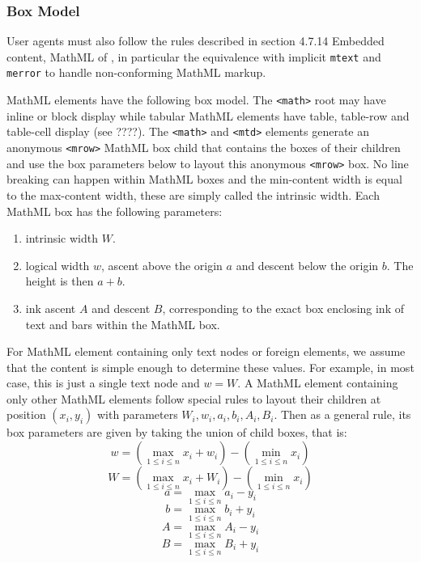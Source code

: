 \subsubsection{Box Model}

User agents must also follow the rules described in section 4.7.14
Embedded content, MathML of \cite{HTML5}, in particular the equivalence with
implicit {\tt mtext} and {\tt merror} to handle non-conforming MathML markup.

MathML elements have the following box model. The {\tt <math>} root may have
inline or block display while tabular MathML elements have table, table-row and
table-cell display (see ????). The {\tt <math>} and {\tt <mtd>} elements
generate an anonymous {\tt <mrow>} MathML box child that contains the boxes of
their children and use the box parameters below to layout this anonymous
{\tt <mrow>} box.
No line breaking can happen within MathML boxes and the min-content width is
equal to the max-content width, these are simply called the intrinsic width.
Each MathML box has the following parameters:

\begin{enumerate}
\item intrinsic width $W$.
\item logical width $w$, ascent above the origin $a$ and descent below the
  origin $b$. The height is then $a+b$.
\item ink ascent $A$ and descent $B$, corresponding to the exact box enclosing
  ink of text and bars within the MathML box.
\end{enumerate}

\begin{figure}
\centering
{}
\label{MathMLBoxModel}
\end{figure}

For MathML element containing only text nodes or foreign elements, we assume
that the content is simple enough to determine these values. For example,
in most case, this is just a single text node and $w = W$.
A MathML element containing only other MathML elements follow special rules to
layout their children at position $(x_i,y_i)$ with parameters
$W_i,w_i,a_i,b_i,A_i,B_i$. Then as a general rule, its box parameters are given
by taking the union of child boxes, that is:
%
$$w = \left(\max_{1 \leq i \leq n } {x_i + w_i}\right) -
      \left(\min_{1 \leq i \leq n} x_i\right)$$
$$W = \left(\max_{1 \leq i \leq n } {x_i + W_i}\right) -
      \left(\min_{1 \leq i \leq n} x_i\right)$$
$$a = \max_{1 \leq i \leq n } {a_i - y_i}$$
$$b = \max_{1 \leq i \leq n } {b_i + y_i}$$
$$A = \max_{1 \leq i \leq n } {A_i - y_i}$$
$$B = \max_{1 \leq i \leq n } {B_i + y_i}$$
%

